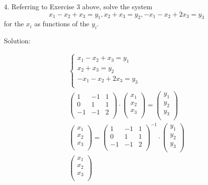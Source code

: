\documentclass{article}
\begin{document}
4. Referring to Exercise 3 above, solve the system 
\[ x_1 - x_2 + x_3 = y_1, x_2 + x_3 = y_2, -x_1 - x_2 + 2x_3 = y_3 \]
for the $x_i$ as functions of the $y_i$.

Solution:

\begin{gather*}
  \begin{cases}
    x_1 - x_2 + x_3 = y_1 \\
    x_2 + x_3 = y_2 \\
    -x_1 - x_2 + 2x_3 = y_3 \\
  \end{cases} \\
  \begin{pmatrix}
    1 & -1 & 1 \\
    0 & 1 & 1 \\
    -1 & -1 & 2 \\
  \end{pmatrix} \cdot
  \begin{pmatrix}
    x_1 \\
    x_2 \\
    x_3 \\
  \end{pmatrix} = 
  \begin{pmatrix}
    y_1 \\
    y_2 \\
    y_3 \\
  \end{pmatrix} \\
  \begin{pmatrix}
    x_1 \\
    x_2 \\
    x_3 \\
  \end{pmatrix} = 
  \begin{pmatrix}
    1 & -1 & 1 \\
    0 & 1 & 1 \\
    -1 & -1 & 2 \\
  \end{pmatrix}^{-1} \cdot
  \begin{pmatrix}
    y_1 \\
    y_2 \\
    y_3 \\
  \end{pmatrix} \\
  \begin{pmatrix}
    x_1 \\
    x_2 \\
    x_3 \\

\end{pmatrix}
\end{gather*}
\end{document}
